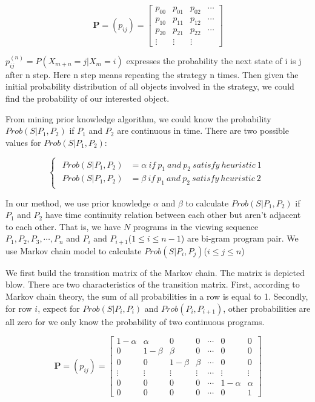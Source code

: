 \begin{equation}
\boldsymbol{P}=(p_{ij})=
\begin{bmatrix}
p_{00} & p_{01} & p_{02} & \cdots \\
p_{10} & p_{11} & p_{12} & \cdots \\
p_{20} & p_{21} & p_{22} & \cdots \\
\vdots & \vdots & \vdots &
\end{bmatrix}
\end{equation}

$p_{ij}^{(n)}=P{(X_{m+n}=j|X_m=i)}$ expresses the probability the next state of i is j after n step. Here n step means
repeating the strategy n times.
Then given the initial probability distribution of all objects involved in the strategy, we could find the probability of our
interested object.

From mining prior knowledge algorithm, we could know the probability $Prob(S|P_1, P_2)$ if $P_1$ and $P_2$ are continuous
in time. There are two possible values for $Prob(S|P_1, P_2)$:

\begin{equation}
\left\{
\begin{aligned}
\begin{array}{cc}
Prob(S|P_1, P_2)&=\alpha\ if\ p_1\ and\ p_2\ satisfy\ heuristic\ 1 \\
Prob(S|P_1, P_2)&=\beta\ if\ p_1\ and\ p_2\ satisfy\ heuristic\ 2
\end{array}
\end{aligned}
\right.
\end{equation}

In our method, we use prior knowledge $\alpha$ and $\beta$ to calculate $Prob(S|P_1, P_2)$ if $P_1$ and $P_2$ have time continuity
relation between each other but aren't adjacent to each other. That is, we have $N$ programs in the viewing sequence
$P_1,P_2,P_3,\cdots,P_n$ and $P_i$ and $P_{i+1}$($1 \leq i \leq n-1$) are bi-gram program pair. We use Markov chain model to calculate
$Prob(S|P_i,P_j)$($i \le j \leq n$)

We first build the transition matrix of the Markov chain. The matrix is depicted blow. There are two characteristics of the transition
matrix. First, according to Markov chain theory, the sum of all probabilities in a row is equal to 1. Secondly, for row $i$, expect for
$Prob(S|P_i,P_i)$ and $Prob(P_i, P_{i+1})$, other probabilities are all zero for we only know the probability of two continuous programs.

\begin{equation}
\boldsymbol{P}=(p_{ij})=
\begin{bmatrix}
1-\alpha & \alpha  & 0 & 0 &  \cdots & 0 & 0 \\
0 & 1-\beta & \beta & 0 & \cdots & 0 & 0 \\
0 & 0 & 1-\beta & \beta & \cdots & 0 &0 \\
\vdots & \vdots & \vdots & \vdots & \cdots & \vdots & \vdots \\
0 & 0 & 0 & 0 & \cdots & 1-\alpha & \alpha \\
0 & 0 & 0 & 0 & \cdots & 0 & 1
\end{bmatrix}
\end{equation}

